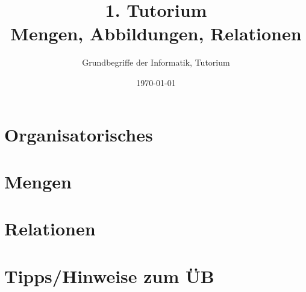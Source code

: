




\title[Mengen, Abbildungen, Relationen]{1. Tutorium\\ Mengen, Abbildungen, Relationen}
\subtitle{Grundbegriffe der Informatik, Tutorium \hashtag\mytutnumber}
\date{\today}


\titleframe
\roadmap

\section{Organisatorisches}



%

\section{Mengen}


\section{Relationen}



\section[ÜB1]{Tipps/Hinweise zum ÜB}


